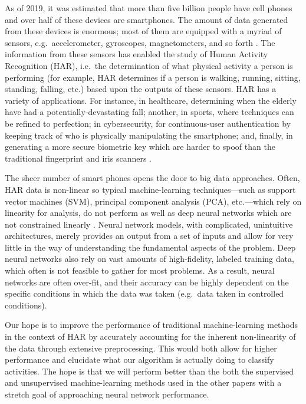 As of 2019, it was estimated that more than five billion people have cell phones and over half of these devices are smartphones. The amount of data generated from these devices is enormous; most of them are equipped with a myriad of sensors, e.g.\ accelerometer, gyroscopes, magnetometers, and so forth \cite{ferrari2019hand}. The information from these sensors has enabled the study of Human Activity Recognition (HAR), i.e.\ the determination of what physical activity a person is performing (for example, HAR determines if a person is walking, running, sitting, standing, falling, etc.) based upon the outputs of these sensors. HAR has a variety of applications. For instance, in healthcare, determining when the elderly have had a potentially-devastating fall; another, in sports, where techniques can be refined to perfection; in cybersecurity, for  continuous-user authentication by keeping track of who is physically manipulating the smartphone; and, finally, in generating a more secure biometric key which are harder to spoof than the traditional fingerprint and iris scanners \cite{malekzadeh2018protecting, saeed2019multi}.

The sheer number of smart phones opens the door to big data approaches. Often, HAR data is non-linear so typical machine-learning techniques---such as support vector machines (SVM), principal component analysis (PCA), etc.---which rely on linearity for analysis,  do not perform as well as deep neural networks which are not constrained linearly \cite{sitova2015hmog,saeed2019multi, he2016deep, ferrari2019homogenization}. Neural network models, with complicated, unintuitive architectures, merely provides an output from a set of inputs and allow for very little in the way of understanding the fundamental aspects of the problem. Deep neural networks also rely on vast amounts of high-fidelity, labeled training data, which often is not feasible to gather for most problems. As a result, neural networks are often over-fit, and their accuracy can be highly dependent on the specific conditions in which the data was taken (e.g.\ data taken in controlled conditions).

Our hope is to improve the performance of traditional machine-learning methods in the context of HAR by accurately accounting for the inherent non-linearity of the data through extensive preprocessing. This would both allow for higher performance and elucidate what our algorithm is actually doing to classify activities. The hope is that we will perform better than the both the supervised and unsupervised machine-learning methods used in the other papers with a stretch goal of approaching neural network performance.

